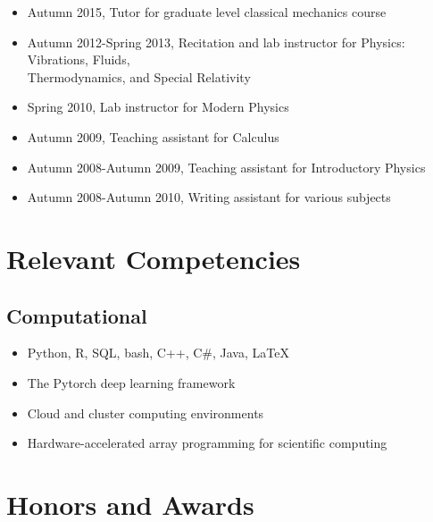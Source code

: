 \documentclass[12pt,letterpaper,roman]{moderncv}        %
\begin{document}
{
\begin{itemize}
\item Autumn 2015, Tutor for graduate level classical mechanics course
\item Autumn 2012-Spring 2013, Recitation and lab instructor for Physics: Vibrations, Fluids,\\Thermodynamics, and Special Relativity
\end{itemize}
}

{
\begin{itemize}
\item Spring 2010, Lab instructor for Modern Physics
\item Autumn 2009, Teaching assistant for Calculus
\item Autumn 2008-Autumn 2009, Teaching assistant for Introductory Physics
\item Autumn 2008-Autumn 2010, Writing assistant for various subjects
\end{itemize}
}

\section{Relevant Competencies}

\subsection{Computational}
\begin{itemize}
\item Python, R, SQL, bash, C++, C\#, Java, LaTeX
\item The Pytorch deep learning framework
\item Cloud and cluster computing environments
\item Hardware-accelerated array programming for scientific computing
\end{itemize}


\section{Honors and Awards}


\clearpage
\end{document}
